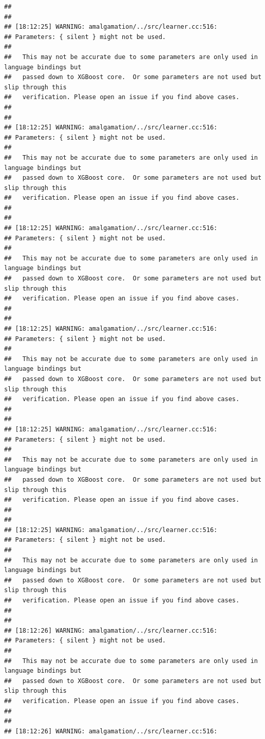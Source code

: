 \documentclass[AMS,STIX2COL]{WileyNJD-v2}\usepackage[]{graphicx}\usepackage[]{color}
\makeatletter
\newenvironment{kframe}{%
 \def\at@end@of@kframe{}%
 \ifinner\ifhmode%
  \def\at@end@of@kframe{\end{minipage}}%
  \begin{minipage}{\columnwidth}%
 \fi\fi%
 \def\FrameCommand##1{\hskip\@totalleftmargin \hskip-\fboxsep
 \colorbox{shadecolor}{##1}\hskip-\fboxsep
     \hskip-\linewidth \hskip-\@totalleftmargin \hskip\columnwidth}%
 \MakeFramed {\advance\hsize-\width
   \@totalleftmargin\z@ \linewidth\hsize
   \@setminipage}}%
 {\par\unskip\endMakeFramed%
 \at@end@of@kframe}
\newenvironment{knitrout}{}{} %
\makeatother
\begin{document}
\begin{knitrout}
\begin{kframe}
\begin{verbatim}
## 
## 
## [18:12:25] WARNING: amalgamation/../src/learner.cc:516: 
## Parameters: { silent } might not be used.
## 
##   This may not be accurate due to some parameters are only used in language bindings but
##   passed down to XGBoost core.  Or some parameters are not used but slip through this
##   verification. Please open an issue if you find above cases.
## 
## 
## [18:12:25] WARNING: amalgamation/../src/learner.cc:516: 
## Parameters: { silent } might not be used.
## 
##   This may not be accurate due to some parameters are only used in language bindings but
##   passed down to XGBoost core.  Or some parameters are not used but slip through this
##   verification. Please open an issue if you find above cases.
## 
## 
## [18:12:25] WARNING: amalgamation/../src/learner.cc:516: 
## Parameters: { silent } might not be used.
## 
##   This may not be accurate due to some parameters are only used in language bindings but
##   passed down to XGBoost core.  Or some parameters are not used but slip through this
##   verification. Please open an issue if you find above cases.
## 
## 
## [18:12:25] WARNING: amalgamation/../src/learner.cc:516: 
## Parameters: { silent } might not be used.
## 
##   This may not be accurate due to some parameters are only used in language bindings but
##   passed down to XGBoost core.  Or some parameters are not used but slip through this
##   verification. Please open an issue if you find above cases.
## 
## 
## [18:12:25] WARNING: amalgamation/../src/learner.cc:516: 
## Parameters: { silent } might not be used.
## 
##   This may not be accurate due to some parameters are only used in language bindings but
##   passed down to XGBoost core.  Or some parameters are not used but slip through this
##   verification. Please open an issue if you find above cases.
## 
## 
## [18:12:25] WARNING: amalgamation/../src/learner.cc:516: 
## Parameters: { silent } might not be used.
## 
##   This may not be accurate due to some parameters are only used in language bindings but
##   passed down to XGBoost core.  Or some parameters are not used but slip through this
##   verification. Please open an issue if you find above cases.
## 
## 
## [18:12:26] WARNING: amalgamation/../src/learner.cc:516: 
## Parameters: { silent } might not be used.
## 
##   This may not be accurate due to some parameters are only used in language bindings but
##   passed down to XGBoost core.  Or some parameters are not used but slip through this
##   verification. Please open an issue if you find above cases.
## 
## 
## [18:12:26] WARNING: amalgamation/../src/learner.cc:516: 

\end{verbatim}
\end{kframe}
\end{knitrout}
\end{document}
